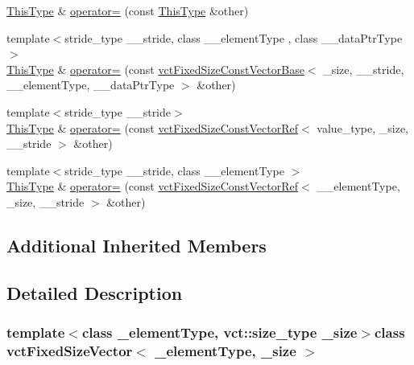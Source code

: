 \begin{DoxyCompactItemize}
\item 
\hyperlink{classvct_fixed_size_const_vector_base_a071063bc4fa43112cc287b2dbef53180}{This\-Type} \& \hyperlink{classvct_fixed_size_vector_a9d3dfdc597e43f3a2a0419ec832035bd}{operator=} (const \hyperlink{classvct_fixed_size_const_vector_base_a071063bc4fa43112cc287b2dbef53180}{This\-Type} \&other)
\item 
{\footnotesize template$<$stride\-\_\-type \-\_\-\-\_\-stride, class \-\_\-\-\_\-element\-Type , class \-\_\-\-\_\-data\-Ptr\-Type $>$ }\\\hyperlink{classvct_fixed_size_const_vector_base_a071063bc4fa43112cc287b2dbef53180}{This\-Type} \& \hyperlink{classvct_fixed_size_vector_aac9630ee0f4155367956b2350399fdb6}{operator=} (const \hyperlink{classvct_fixed_size_const_vector_base}{vct\-Fixed\-Size\-Const\-Vector\-Base}$<$ \-\_\-size, \-\_\-\-\_\-stride, \-\_\-\-\_\-element\-Type, \-\_\-\-\_\-data\-Ptr\-Type $>$ \&other)
\item 
{\footnotesize template$<$stride\-\_\-type \-\_\-\-\_\-stride$>$ }\\\hyperlink{classvct_fixed_size_const_vector_base_a071063bc4fa43112cc287b2dbef53180}{This\-Type} \& \hyperlink{classvct_fixed_size_vector_a49f7d073259cbe575ee73e70b1797cf2}{operator=} (const \hyperlink{classvct_fixed_size_const_vector_ref}{vct\-Fixed\-Size\-Const\-Vector\-Ref}$<$ value\-\_\-type, \-\_\-size, \-\_\-\-\_\-stride $>$ \&other)
\item 
{\footnotesize template$<$stride\-\_\-type \-\_\-\-\_\-stride, class \-\_\-\-\_\-element\-Type $>$ }\\\hyperlink{classvct_fixed_size_const_vector_base_a071063bc4fa43112cc287b2dbef53180}{This\-Type} \& \hyperlink{classvct_fixed_size_vector_a28a9d97591d50f1acf3edfe6e788e849}{operator=} (const \hyperlink{classvct_fixed_size_const_vector_ref}{vct\-Fixed\-Size\-Const\-Vector\-Ref}$<$ \-\_\-\-\_\-element\-Type, \-\_\-size, \-\_\-\-\_\-stride $>$ \&other)
\end{DoxyCompactItemize}

\subsection*{Additional Inherited Members}


\subsection{Detailed Description}
\subsubsection*{template$<$class \-\_\-element\-Type, vct\-::size\-\_\-type \-\_\-size$>$class vct\-Fixed\-Size\-Vector$<$ \-\_\-element\-Type, \-\_\-size $>$}

